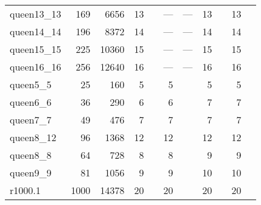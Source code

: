 \begin{longtable}{lrrrlrlrlrl}
  queen13\_13 & 169 & 6656 & 13 & \cite{Malaguti2011} & --- & --- & 13 & \cite{Malaguti2010,Malaguti2011,Mendez-Diaz2006,Brelaz1979,Sewell1996,Segundo2012} & 13 & \cite{Malaguti2010,Malaguti2011} \\ 
  queen14\_14 & 196 & 8372 & 14 & \cite{Malaguti2011} & --- & --- & 14 & \cite{Malaguti2010,Malaguti2011,Mendez-Diaz2006,Brelaz1979,Sewell1996,Segundo2012} & 14 & \cite{Malaguti2010,Malaguti2011} \\ 
  queen15\_15 & 225 & 10360 & 15 & \cite{Malaguti2011} & --- & --- & 15 & \cite{Malaguti2010,Malaguti2011,Mendez-Diaz2006,Brelaz1979,Sewell1996,Segundo2012} & 15 & \cite{Malaguti2010,Malaguti2011} \\ 
  queen16\_16 & 256 & 12640 & 16 & \cite{Malaguti2011} & --- & --- & 16 & \cite{Malaguti2010,Malaguti2011,Mendez-Diaz2006,Brelaz1979,Sewell1996,Segundo2012} & 16 & \cite{Malaguti2010,Malaguti2011} \\ 
  queen5\_5 & 25 & 160 & 5 & \cite{Malaguti2011,Gualandi2012} & 5 & \cite{Gualandi2012} & 5 & \cite{Mehrotra1996,Gualandi2012} & 5 & \cite{Mehrotra1996,Wu2013a,Gualandi2012,Zhou2016} \\ 
  queen6\_6 & 36 & 290 & 6 & \cite{Malaguti2011,Gualandi2012} & 6 & \cite{Gualandi2012} & 7 & \cite{Mehrotra1996,Gualandi2012} & 7 & \cite{Mehrotra1996,Wu2013a,Gualandi2012,Zhou2016} \\ 
  queen7\_7 & 49 & 476 & 7 & \cite{Malaguti2011,Gualandi2012} & 7 & \cite{Gualandi2012} & 7 & \cite{Mehrotra1996,Gualandi2012} & 7 & \cite{Mehrotra1996,Wu2013a,Gualandi2012,Zhou2016} \\ 
  queen8\_12 & 96 & 1368 & 12 & \cite{Malaguti2011,Gualandi2012} & 12 & \cite{Gualandi2012} & 12 & \cite{Mehrotra1996,Gualandi2012,Mendez-Diaz2006,Malaguti2011,Brelaz1979,Sewell1996,Segundo2012} & 12 & \cite{Mehrotra1996,Malaguti2011,Gualandi2012,Mendez-Diaz2006,Brelaz1979,Sewell1996,Segundo2012,Zhou2016} \\ 
  queen8\_8 & 64 & 728 & 8 & \cite{Malaguti2011,Gualandi2012} & 8 & \cite{Gualandi2012} & 9 & \cite{Mehrotra1996,Gualandi2012,Malaguti2011,Mendez-Diaz2006} & 9 & \cite{Mehrotra1996,Malaguti2011,Wu2013a,Gualandi2012,Brelaz1979,Sewell1996,Segundo2012,Zhou2016} \\ 
  queen9\_9 & 81 & 1056 & 9 & \cite{Malaguti2011,Gualandi2012} & 9 & \cite{Gualandi2012} & 10 & \cite{Mehrotra1996,Malaguti2011,Gualandi2012} & 10 & \cite{Mehrotra1996,Malaguti2011,Gualandi2012,Brelaz1979,Sewell1996,Segundo2012,Zhou2016} \\ 
  r1000.1 & 1000 & 14378 & 20 & \cite{Gualandi2012} & 20 & \cite{Gualandi2012} & 20 & \cite{Malaguti2010,Gualandi2012} & 20 & \cite{Morgenstern1996,FunabikiNobuoandHigashino2000,Malaguti2008,Zhou2018,Gualandi2012} \\ 

\end{longtable}

